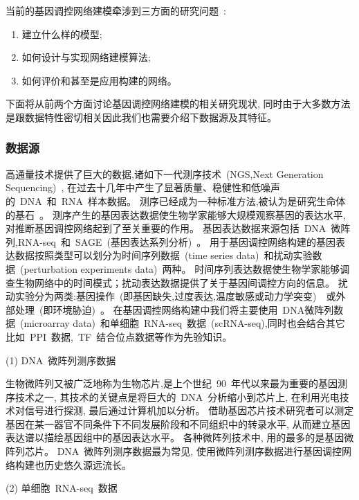 当前的基因调控网络建模牵涉到三方面的研究问题~\cite{schlitt2007current}:
\begin{enumerate}
    \item 建立什么样的模型;
    \item 如何设计与实现网络建模算法;
    \item 如何评价和甚至是应用构建的网络。
\end{enumerate}
下面将从前两个方面讨论基因调控网络建模的相关研究现状,
同时由于大多数方法是跟数据特性密切相关因此我们也需要介绍下数据源及其特征。

\subsubsection{数据源}
高通量技术提供了巨大的数据,诸如下一代测序技术~(NGS,Next Generation Sequencing)~\cite{BUERMANS20141932}, 
在过去十几年中产生了显著质量、稳健性和低噪声的~DNA~和~RNA~样本数据。
测序已经成为一种标准方法,被认为是研究生命体的基石~\cite{CEREB2015923}。
测序产生的基因表达数据使生物学家能够大规模观察基因的表达水平, 对推断基因调控网络起到了至关重要的作用。
基因表达数据来源包括~DNA~微阵列,RNA-seq~\cite{morin2008profiling}和~SAGE~(基因表达系列分析)~\cite{velculescu1995serial}。
用于基因调控网络构建的基因表达数据按照类型可以划分为时间序列数据~(time series data)~和扰动实验数据~(perturbation experiments data)~两种。
时间序列表达数据使生物学家能够调查生物网络中的时间模式；扰动表达数据提供了关于基因间调控方向的信息。
扰动实验分为两类:基因操作~(即基因缺失,过度表达,温度敏感或动力学突变)~\cite{holstege1998dissecting}~或外部处理~(即环境胁迫)~\cite{gasch2000genomic}。
在基因调控网络构建中我们将主要使用~DNA微阵列数据~(microarray data)~和单细胞~RNA-seq~数据~(scRNA-seq),同时也会结合其它比如~PPI~数据,~TF~结合位点数据等作为先验知识。

(1) DNA~微阵列测序数据

生物微阵列又被广泛地称为生物芯片,是上个世纪~90~年代以来最为重要的基因测序技术之一,
其技术的关键点是将巨大的~DNA~分析缩小到芯片上, 在利用光电技术对信号进行探测, 最后通过计算机加以分析。
借助基因芯片技术研究者可以测定基因在某一器官不同条件下不同发展阶段和不同组织中的转录水平,
从而建立基因表达谱以描绘基因组中的基因表达水平。
各种微阵列技术中, 用的最多的是基因微阵列芯片。
DNA~微阵列测序数据最为常见, 使用微阵列测序数据进行基因调控网络构建也历史悠久源远流长。

(2) 单细胞~RNA-seq~数据

